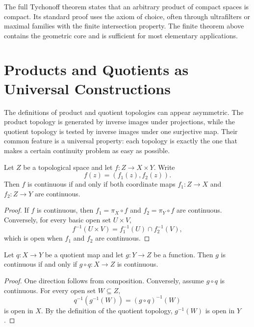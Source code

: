 \begin{remark}
The full Tychonoff theorem states that an arbitrary product of compact spaces is compact. Its standard proof uses the axiom of choice, often through ultrafilters or maximal families with the finite intersection property. The finite theorem above contains the geometric core and is sufficient for most elementary applications.
\end{remark}

\section{Products and Quotients as Universal Constructions}

The definitions of product and quotient topologies can appear asymmetric. The product topology is generated by inverse images under projections, while the quotient topology is tested by inverse images under one surjective map. Their common feature is a universal property: each topology is exactly the one that makes a certain continuity problem as easy as possible.

\begin{theorem}
Let $Z$ be a topological space and let $f:Z\to X\times Y$. Write
\[
    f(z)=(f_1(z),f_2(z)).
\]
Then $f$ is continuous if and only if both coordinate maps $f_1:Z\to X$ and $f_2:Z\to Y$ are continuous.
\end{theorem}

\begin{proof}
If $f$ is continuous, then $f_1=\pi_X\circ f$ and $f_2=\pi_Y\circ f$ are continuous. Conversely, for every basic open set $U\times V$,
\[
    f^{-1}(U\times V)=f_1^{-1}(U)\cap f_2^{-1}(V),
\]
which is open when $f_1$ and $f_2$ are continuous.
\end{proof}

\begin{theorem}
Let $q:X\to Y$ be a quotient map and let $g:Y\to Z$ be a function. Then $g$ is continuous if and only if $g\circ q:X\to Z$ is continuous.
\end{theorem}

\begin{proof}
One direction follows from composition. Conversely, assume $g\circ q$ is continuous. For every open set $W\subseteq Z$,
\[
    q^{-1}(g^{-1}(W))=(g\circ q)^{-1}(W)
\]
is open in $X$. By the definition of the quotient topology, $g^{-1}(W)$ is open in $Y$.
\end{proof}

